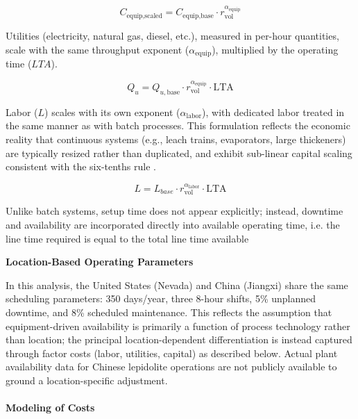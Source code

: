 \begin{equation}
    C_{\text{equip,scaled}} = C_{\text{equip,base}} \cdot r_{\text{vol}} ^ {\alpha_{\text{equip}}}
\end{equation}
\alteqend

Utilities (electricity, natural gas, diesel, etc.), measured in per-hour quantities, scale with the same throughput exponent ($\alpha_{\text{equip}}$), multiplied by the operating time ($LTA$).

\begin{equation}
    Q_u = Q_{u,\text{base}} \cdot r_{\text{vol}} ^ {\alpha_{\text{equip}}} \cdot \text{LTA}
\end{equation}

Labor ($L$) scales with its own exponent ($\alpha_{\text{labor}}$), with dedicated labor treated in the same manner as with batch processes. This formulation reflects the economic reality that continuous systems (e.g., leach trains, evaporators, large thickeners) are typically resized rather than duplicated, and exhibit sub-linear capital scaling consistent with the six-tenths rule \citep{petersPlantDesignEconomics1991}. 

\begin{equation}
    L = L_{base} \cdot r_{\text{vol}} ^ {\alpha_{\text{labor}}} \cdot \text{LTA}
\end{equation}

Unlike batch systems, setup time does not appear explicitly; instead, downtime and availability are incorporated directly into available operating time, i.e. the line time required is equal to the total line time available

\medskip
\noindent\textbf{Location-Based Operating Parameters}\quad

In this analysis, the United States (Nevada) and China (Jiangxi) share the same scheduling parameters: 350 days/year, three 8-hour shifts, 5\% unplanned downtime, and 8\% scheduled maintenance. This reflects the assumption that equipment-driven availability is primarily a function of process technology rather than location; the principal location-dependent differentiation is instead captured through factor costs (labor, utilities, capital) as described below. Actual plant availability data for Chinese lepidolite operations are not publicly available to ground a location-specific adjustment.

\paragraph{Modeling of Costs}\label{app:04-methods-system-costs}

